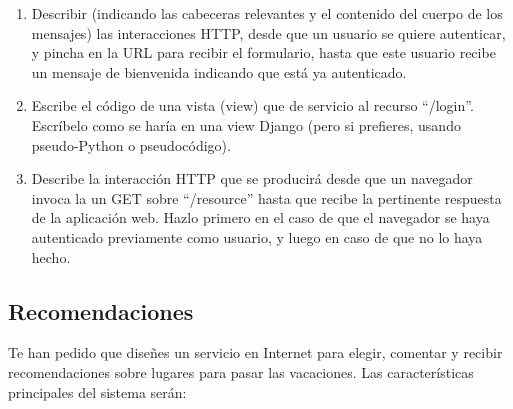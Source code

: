 \begin{enumerate}
\item Describir (indicando las cabeceras relevantes y el contenido del cuerpo de los mensajes) las interacciones HTTP, desde que un usuario se quiere autenticar, y pincha en la URL para recibir el formulario, hasta que este usuario recibe un mensaje de bienvenida indicando que está ya autenticado.
\item Escribe el código de una vista (view) que de servicio al recurso ``/login''. Escríbelo como se haría en una view Django (pero si prefieres, usando pseudo-Python o pseudocódigo).
\item Describe la interacción HTTP que se producirá desde que un navegador invoca la un GET sobre ``/resource'' hasta que recibe la pertinente respuesta de la aplicación web. Hazlo primero en el caso de que el navegador se haya autenticado previamente como usuario, y luego en caso de que no lo haya hecho.
\end{enumerate}

\subsection{Recomendaciones}

Te han pedido que diseñes un servicio en Internet para elegir, comentar y recibir recomendaciones sobre lugares para pasar las vacaciones. Las características principales del sistema serán:

